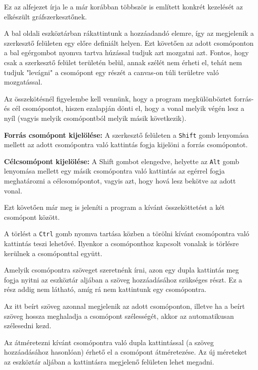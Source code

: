 Ez az alfejezet írja le a már korábban többször is említett konkrét kezelését az elkészült gráfszerkesztőnek.


A bal oldali eszköztárban rákattintunk a hozzáadandó elemre, így az megjelenik a szerkesztő felületen egy előre definiált helyen. Ezt követően az adott csomóponton a bal egérgombot nyomva tartva húzással tudjuk azt mozgatni azt. Fontos, hogy csak a szerkesztő felület területén belül, annak szélét nem érheti el, tehát nem tudjuk "levágni" a csomópont egy részét a canvas-on túli területre való mozgatással.


Az összekötésnél figyelembe kell vennünk, hogy a program megkülönböztet forrás- és cél csomópontot, hiszen ezalapján dönti el, hogy a vonal melyik végén lesz a nyíl (vagyis melyik csomópontból melyik másik következik).

\textbf{Forrás csomópont kijelölése:} A szerkesztő felületen a \texttt{Shift} gomb lenyomása mellett az adott csomópontra való kattintás fogja kijelöni a forrás csomópontot.

\textbf{Célcsomópont kijelölése:} A Shift gombot elengedve, helyette az \texttt{Alt} gomb lenyomása mellett egy másik csomópontra való kattintás az egérrel fogja meghatározni a célcsomópontot, vagyis azt, hogy hová lesz bekötve az adott vonal.

Ezt követően már meg is jeleníti a program a kívánt összeköttetést a két csomópont között.


A törlést a \texttt{Ctrl} gomb nyomva tartása közben a törölni kívánt csomópontra való kattintás teszi lehetővé. Ilyenkor a csomóponthoz kapcsolt vonalak is törlésre kerülnek a csomóponttal együtt.


Amelyik csomópontra szöveget szeretnénk írni, azon egy dupla kattintás meg fogja nyitni az eszköztár aljában a szöveg hozzáadásához szükséges részt. Ez a rész addig nem látható, amíg rá nem kattintunk egy csomópontra.

Az itt beírt szöveg azonnal megjelenik az adott csomóponton, illetve ha a beírt szöveg hossza meghaladja a csomópont szélességét, akkor az automatikusan szélesedni kezd.


Az átméretezni kívánt csomópontra való dupla kattintással (a szöveg hozzáadásához hasonlóan) érhető el a csomópont átméretezése. Az új méreteket az eszköztár aljában a kattintásra megjelenő felületen lehet megadni.

